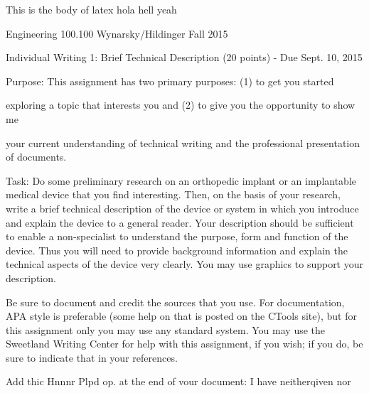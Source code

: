 \documentclass[12pt]{article}
\author{Rose Xu}
\date{\today}
\begin{document}
\maketitle

This is the body of latex hola hell yeah

Engineering 100.100  Wynarsky/Hildinger
Fall 2015

Individual Writing 1: Brief Technical Description (20 points) - Due Sept. 10, 2015

Purpose: This assignment has two primary purposes: (1) to get you started

exploring a topic that interests you and (2) to give you the opportunity to show me

your current understanding of technical writing and the professional presentation
of documents.

Task: Do some preliminary research on an orthopedic implant or an implantable
medical device that you find interesting. Then, on the basis of your research, write a
brief technical description of the device or system in which you introduce and
explain the device to a general reader. Your description should be sufficient to
enable a non-specialist to understand the purpose, form and function of the device.
Thus you will need to provide background information and explain the technical
aspects of the device very clearly. You may use graphics to support your description.

Be sure to document and credit the sources that you use. For documentation, APA
style is preferable (some help on that is posted on the CTools site), but for this
assignment only you may use any standard system. You may use the Sweetland
Writing Center for help with this assignment, if you wish; if you do, be sure to
indicate that in your references.

Add thic Hnnnr Plpd op. at the end of vour document: I have neitherqiven nor
\end{document}

